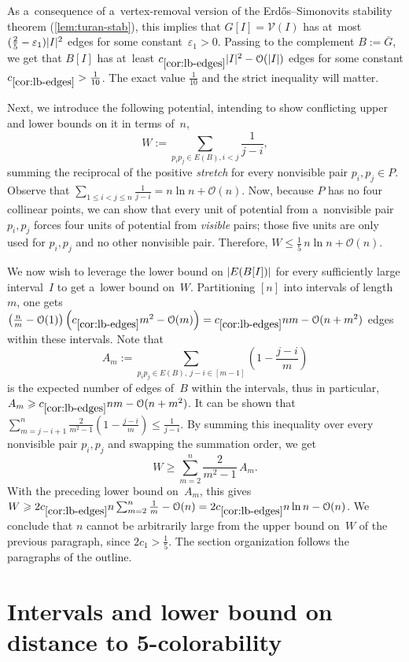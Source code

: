 \documentclass[11pt,a4paper]{article}
\newcommand{\Oh}{\mathcal{O}}
\newcommand{\vis}{\mathcal V}
\begin{document}
As a~consequence of a~vertex-removal version of the Erd\H{o}s--Simonovits stability theorem (\cref{lem:turan-stab}), this implies that $G[I] = \vis(I)$ has at~most $(\frac{2}{5}-\varepsilon_1)\mathopen| I \mathclose|^2$ edges for some constant~$\varepsilon_1 > 0$.
Passing to the complement $B := \overline{G}$, we get that $B[I]$ has at~least $c_{\ref{cor:lb-edges}}\abs{I}^2 - \Oh(\abs{I})$ edges for some constant $c_{\ref{cor:lb-edges}} > \frac{1}{10}$.
The exact value $\frac{1}{10}$ and the strict inequality will matter.

Next, we introduce the following potential, intending to show conflicting upper and lower bounds on it in terms of~$n$,
\[W := \sum\limits_{p_i p_j \in E(B), i < j} \frac{1}{j-i},\] summing the reciprocal of the positive \emph{stretch} for every nonvisible pair $p_i, p_j \in P$.
Observe that $\sum_{1 \leqslant i < j \leqslant n} \frac{1}{j-i} = n \ln n + \Oh(n)$.
Now, because $P$ has no four collinear points, we can show that every unit of potential from a~nonvisible pair $p_i, p_j$ forces four units of potential from \emph{visible} pairs; those five units are only used for $p_i, p_j$ and no other nonvisible pair.
Therefore, $W \leqslant \frac{1}{5}\,n \ln n + \Oh(n)$.

We now wish to leverage the lower bound on $\mathopen| E(B[I]) \mathclose|$ for every sufficiently large interval~$I$ to get a~lower bound on~$W$.
Partitioning $[n]$ into intervals of length~$m$, one gets $\left(\frac{n}{m}-\Oh(1)\right) \left(c_{\ref{cor:lb-edges}}m^2 - \Oh(m)\right) = c_{\ref{cor:lb-edges}}nm - \Oh(n+m^2)$ edges within these intervals.  
Note that \[A_m := \sum\limits_{p_ip_j \in E(B),~j-i \in [m-1]} \left(1-\frac{j-i}{m}\right)\]
is the expected number of edges of~$B$ within the intervals, thus in particular, $A_m \geqslant c_{\ref{cor:lb-edges}}nm - \Oh(n+m^2)$.
It can be shown that $\sum_{m = j-i+1}^n \frac{2}{m^2-1} \left(1-\frac{j-i}{m}\right) \leqslant \frac{1}{j-i}$.
By summing this inequality over every nonvisible pair $p_i, p_j$ and swapping the summation order, we get \[W \geqslant \sum_{m=2}^n \frac{2}{m^2-1}\,A_m.\]
With the preceding lower bound on~$A_m$, this gives $W \geqslant 2c_{\ref{cor:lb-edges}}n \sum_{m=2}^n \frac{1}{m} - \Oh(n) = 2c_{\ref{cor:lb-edges}}n \ln n - \Oh(n)$.
We conclude that $n$ cannot be arbitrarily large from the upper bound on~$W$ of the previous paragraph, since $2c_1 > \frac{1}{5}$.
The section organization follows the paragraphs of the outline.

\section{Intervals and lower bound on distance to 5-colorability} 
\end{document}
